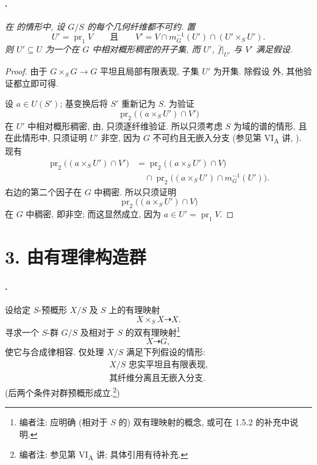 \paragraph{.}
\textit{在 的情形中,
设 \(G/S\) 的每个几何纤维都不可约. 置
\[
  U'=\operatorname{pr}_1V
  \qquad\text{且}\qquad
  V'=V\cap m_G^{-1}(U')\cap(U'\times_S U').
\]
则 \(U'\subseteq U\) 为一个在 \(G\) 中相对概形稠密的开子集,
而 \(U'\), \(\bar f|_{U'}\) 与 \(V'\)
满足假设\textup{}.}

\begin{proof}
由于 \(G\times_S G\to G\) 平坦且局部有限表现, 子集 \(U'\) 为开集.
除假设\textup{} 外,
其他验证都立即可得.

设 \(a\in U(S')\); 基变换后将 \(S'\) 重新记为 \(S\).
为验证
\[
  \operatorname{pr}_2\bigl((a\times_S U')\cap V'\bigr)
\]
在 \(U'\) 中相对概形稠密,
由, 只须逐纤维验证.
所以只须考虑 \(S\) 为域的谱的情形,
且在此情形中, 只须证明 \(U'\) 非空,
因为 \(G\) 不可约且无嵌入分支 (参见第 VI\textsubscript{A} 讲, ).
现有
\[
\begin{aligned}
  \operatorname{pr}_2\bigl((a\times_S U')\cap V'\bigr)
  &=
  \operatorname{pr}_2\bigl((a\times_S U')\cap V\bigr)\\
  &\quad{}\cap
  \operatorname{pr}_2\bigl((a\times_S U')\cap m_G^{-1}(U')\bigr).
\end{aligned}
\]
右边的第二个因子在 \(G\) 中稠密.
所以只须证明
\[
  \operatorname{pr}_2\bigl((a\times_S U')\cap V\bigr)
\]
在 \(G\) 中稠密, 即非空; 而这显然成立, 因为 \(a\in U'=\operatorname{pr}_1V\).
\end{proof}

\section*{3. 由有理律构造群}

\paragraph{.}
设给定 \(S\)-预概形 \(X/S\) 及 \(S\) 上的有理映射
\[
  X\times_S X\dashrightarrow X.
\]
寻求一个 \(S\)-群 \(G/S\) 及相对于 \(S\) 的双有理映射\footnote{编者注:
应明确 (相对于 \(S\) 的) 双有理映射的概念, 或可在 1.5.2 的补充中说明.}
\[
  X\dashrightarrow G,
\]
使它与合成律相容. 仅处理 \(X/S\) 满足下列假设的情形:
\[
\tag{\(\diamond\)}\label{sga3:xviii:section:3:equation:diamond}
\begin{gathered}
  X/S\text{ 忠实平坦且有限表现,}\\
  \text{其纤维分离且无嵌入分支.}
\end{gathered}
\]
(后两个条件对群预概形成立.\footnote{编者注: 参见第 VI\textsubscript{A} 讲;
具体引用有待补充.})

